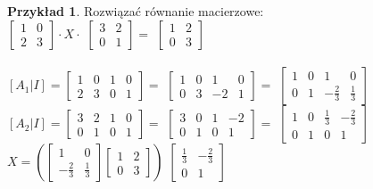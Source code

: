 \documentclass{article}
\theoremstyle{definition}
\theoremstyle{definition}
\theoremstyle{definition}
\newtheorem{pk}{Przykład}[subsection]
\theoremstyle{definition}
\begin{document}
\begin{pk}
Rozwiązać równanie macierzowe:\\

$ \begin{bmatrix}
    1 & 0 \\
    2 & 3 
    \end{bmatrix}  \cdot X \cdot $
$ \begin{bmatrix}
    3 & 2 \\
    0 & 1 
    \end{bmatrix} = $
$ \begin{bmatrix}
    1 & 2 \\
    0 & 3 
    \end{bmatrix}  $\\\\

$ [A_1|I]=\begin{bmatrix}
    1 & 0 & 1 & 0 \\
    2 & 3 & 0 & 1 
    \end{bmatrix} =$
$ \begin{bmatrix}
    1 & 0 & 1 & 0 \\
    0 & 3 & -2 & 1 
    \end{bmatrix} =$
$ \begin{bmatrix}
    1 & 0 & 1 & 0 \\
    0 & 1 & -\frac{2}{3} & \frac{1}{3} 
    \end{bmatrix}  $\\

$[A_2|I]=\begin{bmatrix}
    3 & 2 & 1 & 0 \\
    0 & 1 & 0 & 1 
    \end{bmatrix} =$
$ \begin{bmatrix}
    3 & 0 & 1 & -2 \\
    0 & 1 & 0 & 1 
    \end{bmatrix}  =$
$ \begin{bmatrix}
    1 & 0 & \frac{1}{3} & -\frac{2}{3} \\
    0 & 1 & 0 & 1 
    \end{bmatrix}  $\\

$X=\left( \begin{bmatrix}
    1 & 0 \\
    -\frac{2}{3} & \frac{1}{3} 
    \end{bmatrix} 
 \begin{bmatrix}
    1 & 2 \\
    0 & 3 
    \end{bmatrix} \right)$
$ \begin{bmatrix}
    \frac{1}{3} & -\frac{2}{3} \\
    0 & 1 
    \end{bmatrix}  $\\


\end{pk}
\end{document}
